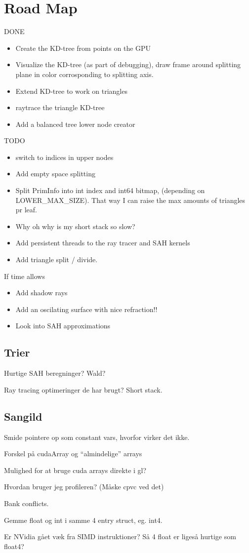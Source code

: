 \section*{Road Map}


DONE
\begin{itemize}
\item Create the KD-tree from points on the GPU
\item Visualize the KD-tree (as part of debugging), draw frame around
  splitting plane in color corrosponding to splitting axis.
\item Extend KD-tree to work on triangles
\item raytrace the triangle KD-tree
\item Add a balanced tree lower node creator
\end{itemize}

TODO
\begin{itemize}
\item switch to indices in upper nodes
\item Add empty space splitting
\item Split PrimInfo into int index and int64 bitmap, (depending on
  LOWER\_MAX\_SIZE). That way I can raise the max amounts of triangles
  pr leaf.
\item Why oh why is my short stack so slow?
\item Add persistent threads to the ray tracer and SAH kernels
\item Add triangle split / divide.
\end{itemize}

If time allows

\begin{itemize}
\item Add shadow rays
\item Add an oscilating surface with nice refraction!!
\item Look into SAH approximations
\end{itemize}



\subsection*{Trier}

Hurtige SAH beregninger? Wald?

Ray tracing optimeringer de har brugt? Short stack.


\subsection*{Sangild}

Smide pointere op som constant vars, hvorfor virker det ikke.

Forskel på cudaArray og ``almindelige'' arrays

Mulighed for at bruge cuda arrays direkte i gl?

Hvordan bruger jeg profileren? (Måske cpvc ved det)

Bank conflicts.

Gemme float og int i samme 4 entry struct, eg. int4.

Er NVidia gået væk fra SIMD instruktioner? Så 4 float er ligeså
hurtige som float4?
